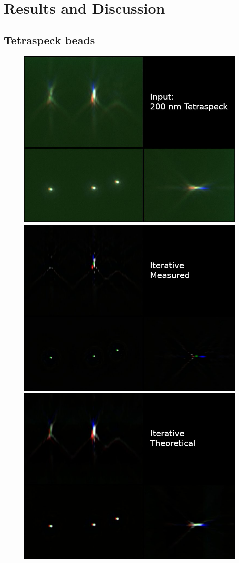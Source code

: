 \section{Results and Discussion}

\subsection{Tetraspeck beads}

\begin{figure}
\centering
\includegraphics[width=.48\columnwidth]{Exp_7_Deconvolution/Figures/bcomposite/g_b_input}\\
\includegraphics[width=.48\columnwidth]{Exp_7_Deconvolution/Figures/bcomposite/g_b_iterc}
\includegraphics[width=.48\columnwidth]{Exp_7_Deconvolution/Figures/bcomposite/g_b_itert}\\

\end{figure}
